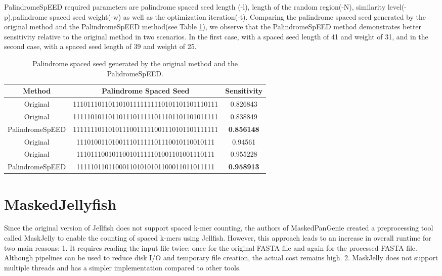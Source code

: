 \documentclass{PHlab-thesis}
\begin{document}
PalindromeSpEED required parameters are palindrome spaced seed length (-l), length of the random region(-N), similarity level(-p),palindrome spaced seed weight(-w) as well as the optimization iteration(-t). Comparing the palindrome spaced seed generated by the original method and the PalindromeSpEED method(see Table \ref{table:PalindromeSpEED}), we observe that the PalindromeSpEED method demonstrates better sensitivity relative to the original method in two scenarios. In the first case, with a spaced seed length of 41 and weight of 31, and in the second case, with a spaced seed length of 39 and weight of 25.
\begin{table}[h!]
	\centering
	\begin{tabular*}{\textwidth}{@{\extracolsep{\fill}}ccc@{\extracolsep{\fill}}}
        \toprule
        Method & Palindrome Spaced Seed & Sensitivity\\
        \midrule
        Original&11101110110110101111111110101101101110111&0.826843\\
        Original&11111010110110111011111011101101101011111&0.838849\\
        PalindromeSpEED&11111110110101110011111001110101101111111&\textbf{0.856148}\\
        \midrule 
        Original&111010011010011101111101110010110010111&0.94561\\
        Original&111011100101100101111101001101001110111&0.955228\\
        PalindromeSpEED&111110110110001101010101100011011011111&\textbf{0.958913}\\
        \bottomrule 
	\end{tabular*}
	\caption{Palindrome spaced seed generated by the original method and the PalidromeSpEED.}
	\label{table:PalindromeSpEED}
\end{table}
\section{MaskedJellyfish}
Since the original version of Jellfish does not support spaced k-mer counting, the authors of MaskedPanGenie created a preprocessing tool called MaskJelly to enable the counting of spaced k-mers using Jellfish. However, this approach leads to an increase in overall runtime for two main reasons: 1. It requires reading the input file twice: once for the original FASTA file and again for the processed FASTA file. Although pipelines can be used to reduce disk I/O and temporary file creation, the actual cost remains high. 2. MaskJelly does not support multiple threads and has a simpler implementation compared to other tools.
\end{document}
